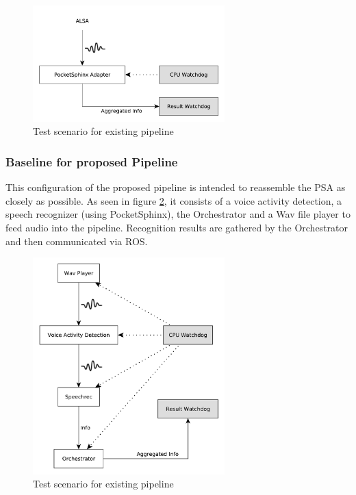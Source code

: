\begin{figure}[]
	\centering
	\includegraphics[width=0.66\textwidth]{diagrams/eval_pipeline_1.pdf}
	\caption{Test scenario for existing pipeline}
	\label{pic:eval_p1_diag}
\end{figure}

\subsubsection{Baseline for proposed Pipeline}
\label{eval:dataset:pipeline:baseline}
This configuration of the proposed pipeline is intended to reassemble the PSA as closely as possible.
As seen in figure \ref{pic:eval_p2_diag}, it consists of a voice activity detection, a speech recognizer (using PocketSphinx), the Orchestrator and a Wav file player to feed audio into the pipeline.
Recognition results are gathered by the Orchestrator and then communicated via ROS.

\begin{figure}[]
	\centering
	\includegraphics[width=0.66\textwidth]{diagrams/eval_pipeline_2.pdf}
	\caption{Test scenario for existing pipeline}
	\label{pic:eval_p2_diag}
\end{figure}


